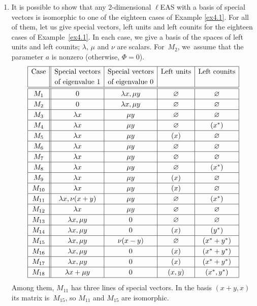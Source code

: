 \documentclass[10pt,a4paper]{amsart}
\numberwithin{equation}{section}
\begin{document}
\begin{Example}
\begin{enumerate}
\item[(2)] It is possible to show that any 2-dimensional $\ell$EAS with a basis of special vectors is isomorphic to one of the eighteen cases of Example \ref{ex4.1}.
For all of them, let us give special vectors, left units and left counits for the eighteen cases of Example~\ref{ex4.1}.
In each case, we give a basis of the spaces of left units and left counits; $\lambda$, $\mu$ and $\nu$ are scalars. For~$M_2$, we~assume that the parameter $a$ is nonzero (otherwise, $\Phi=0$).
$$\renewcommand{\arraystretch}{1.2} \begin{array}{|c||c|c|c|c|}
\hline \text{Case}&\text{Special vectors}&\text{Special vectors}&\text{Left units}&\text{Left counits}\\
&\text{of eigenvalue 1}&\text{of eigenvalue 0}&&\\
\hline\hline M_1&0&\lambda x, \mu y&\varnothing&\varnothing\\
\hline M_2&0&\lambda x, \mu y&\varnothing&\varnothing\\
\hline M_3&\lambda x&\mu y&\varnothing&\varnothing\\
\hline M_4&\lambda x&\mu y&\varnothing& (x^*)\\
\hline M_5&\lambda x&\mu y&(x)&\varnothing\\
\hline M_6&\lambda x&\mu y&\varnothing&\varnothing\\
\hline M_7&\lambda x&\mu y&\varnothing&\varnothing\\
\hline M_8&\lambda x&\mu y&\varnothing& (x^*)\\
\hline M_9&\lambda x&\mu y&(x)&\varnothing\\
\hline M_{10}&\lambda x&\mu y&(x)&\varnothing\\
\hline M_{11}&\lambda x,\nu(x+y)&\mu y&\varnothing& (x^*)\\
\hline M_{12}&\lambda x&\mu y&\varnothing&\varnothing\\
\hline M_{13}&\lambda x, \mu y&0&\varnothing&\varnothing\\
\hline M_{14}&\lambda x, \mu y&0&(x)&(y^*)\\
\hline M_{15}&\lambda x, \mu y&\nu(x-y)&\varnothing&(x^*+y^*)\\
\hline M_{16}&\lambda x, \mu y&0&(x)&(x^*+y^*)\\
\hline M_{17}&\lambda x, \mu y&0&(x)&(x^*+y^*)\\
\hline M_{18}&\lambda x+\mu y&0&(x,y)&(x^*,y^*)\\
\hline \end{array}$$
Among them, $M_{11}$ has three lines of special vectors. In the basis $(x+y,x)$ its matrix is~$M_{15}$, so $M_{11}$ and $M_{15}$ are isomorphic.
\end{enumerate}\end{Example}
\end{document}
